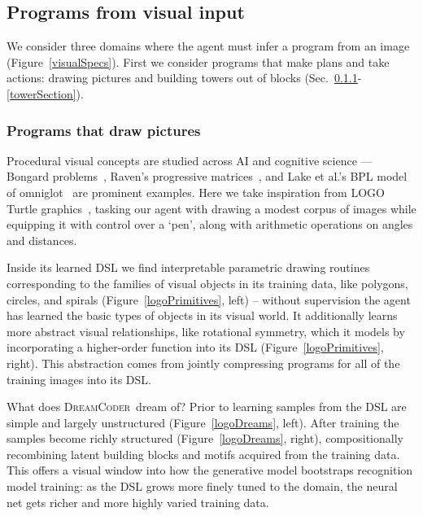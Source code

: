 \documentclass{article}
\newcommand{\system}{\textsc{DreamCoder}~}
\newcommand{\code}[1]{{\footnotesize\texttt{#1}}}
\begin{document}
\subsection{Programs from visual input}
We consider three domains where the agent must infer a program from an
image (Figure~\ref{visualSpecs}).
First we consider programs that make plans and take actions:  drawing pictures and building towers out of blocks (Sec.~\ref{logoSection}-\ref{towerSection}).

\subsubsection{Programs that draw pictures}\label{logoSection}

Procedural visual concepts are studied across AI and cognitive science
--- Bongard problems~\cite{Moscow}, Raven's progressive
matrices~\cite{raven2003raven}, and Lake et al.'s BPL model of
omniglot~\cite{lake2015human} are prominent examples.  Here we take
inspiration from LOGO Turtle graphics~\cite{turtle}, tasking our agent
with drawing a modest corpus of images while equipping it with control
over a `pen', along with arithmetic operations on angles and
distances.

Inside its learned DSL we find interpretable parametric drawing
routines corresponding to the families of visual objects in its
training data, like polygons, circles, and spirals
(Figure~\ref{logoPrimitives}, left) -- without supervision the agent
has learned the basic types of objects in its visual world. It
additionally learns more abstract visual relationships, like
rotational symmetry, which it models by incorporating a higher-order
function into its DSL (Figure~\ref{logoPrimitives}, right).  This
abstraction comes from jointly compressing programs for all of the
training images into its DSL.

What does \system dream of?  Prior to learning samples from the DSL
are simple and largely unstructured (Figure~\ref{logoDreams}, left).
After training the samples become richly structured
(Figure~\ref{logoDreams}, right), compositionally recombining latent
building blocks and motifs acquired from the training data. This
offers a visual window into how the generative model bootstraps recognition
model training: as the DSL grows more finely tuned to the domain, the
neural net gets richer and more highly varied training data.


\end{document}
